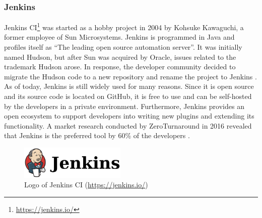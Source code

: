 
\subsubsection{Jenkins}
Jenkins CI\footnote{\url{https://jenkins.io/}} was started as a hobby project in 2004 by Kohsuke Kawaguchi, a former employee of Sun Microsystems. Jenkins is programmed in Java and profiles itself as ``The leading open source automation server''. It was initially named Hudson, but after Sun was acquired by Oracle, issues related to the trademark Hudson arose. In response, the developer community decided to migrate the Hudson code to a new repository and rename the project to Jenkins \cite{SmartJenkinsDefinitive}. As of today, Jenkins is still widely used for many reasons. Since it is open source and its source code is located on GitHub, it is free to use and can be self-hosted by the developers in a private environment. Furthermore, Jenkins provides an open ecosystem to support developers into writing new plugins and extending its functionality. A market research conducted by ZeroTurnaround in 2016 revealed that Jenkins is the preferred \CI{} tool by 60\% of the developers \cite{maple_2016}.

\begin{figure}[htbp!]
	\centering
	\includegraphics[width=0.45\textwidth]{assets/images/jenkins.pdf}
	\caption{Logo of Jenkins CI (\url{https://jenkins.io/})}
	\label{fig:jenkins}
\end{figure}